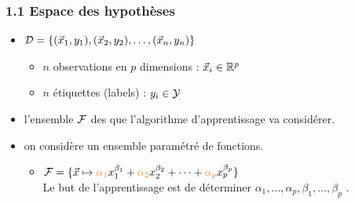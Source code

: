 \begin{frame}
  \frametitle{1.1 Espace des hypothèses}
  \begin{itemize}
  \item {} $\mathcal{D} = \{(\vec{x}_1, y_1), (\vec{x}_2, y_2), \dots, (\vec{x}_n, y_n)\} $ 
    \begin{itemize}
    \item $n$ observations en $p$ dimensions : $\vec{x}_i \in  {\mathbb R}^p$
    \item $n$ étiquettes \textcolor{gray!70}{(labels)} : $y_i \in \mathcal{Y}$
    \end{itemize}
    \pause
  \item {} l'ensemble $\mathcal{F}$ des  que
    l'algorithme d'apprentissage va considérer.  \pause
  \item {} on considère un ensemble paramétré de fonctions.
    \begin{itemize}
    \item[]  
      $\fcal = \{ \xvec \mapsto {\color{MyOrange}\alpha_1} x_1^{\beta_1} +
      {\color{MyOrange}\alpha_2} x_2^{\beta_2} + \dots + {\color{MyOrange}\alpha_p} x_p^{\beta_p} \}$ \\
      Le but de l'apprentissage est de déterminer $\alpha_1, \dots, \alpha_p, \beta_1, \dots, \beta_p$ .
    \end{itemize}
  \end{itemize}
\end{frame}

